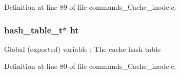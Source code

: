 Definition at line 89 of file commands\_\-Cache\_\-inode.c.
\subsubsection[{ht}]{\setlength{\rightskip}{0pt plus 5cm}hash\_\-table\_\-t$\ast$ {\bf ht}}\label{commands__Cache__inode_8c_ab1121adcdb706f580e1a8375f126c0f4}
Global (exported) variable : The cache hash table 

Definition at line 80 of file commands\_\-Cache\_\-inode.c.